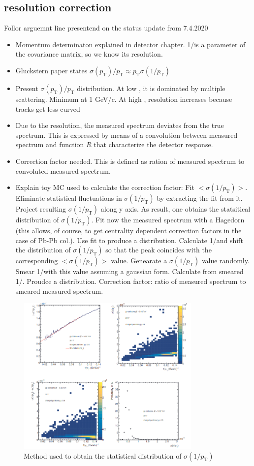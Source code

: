 \documentclass[12pt,a4paper]{report}
\begin{document}
\subsection{\pt resolution correction}
Follor arguemnt line presentend on the status update from 7.4.2020
\begin{itemize}
\item Momentum determinaton explained in detector chapter. 1/\pt is a parameter of the covariance matrix, so we know its resolution. 
\item Gluckstern paper states $\sigma(p_\text{T})/p_\text{T} \approx p_\text{T}\sigma(1/p_\text{T})$
\item Present $\sigma(p_\text{T})/p_\text{T}$ distribution. At low \pt, it is dominated by multiple scattering. Minimum at 1 GeV/$c$. At high \pt, resolution increases because tracks get less curved
\item Due to the \pt resolution, the measured spectrum deviates from the true spectrum. This is expressed by means of a convolution between measured spectrum and function $R$ that characterize the detector response.
\item Correction factor needed. This is defined as ration of measured spectrum to convoluted measured spectrum.
\item Explain toy MC used to calculate the correction factor: Fit $<\sigma(1/p_\text{T})>$. Eliminate statistical fluctuations in $\sigma(1/p_\text{T})$  by extracting the fit from it. Project resulting  $\sigma(1/p_\text{T})$ along y axis. As result, one obtains the statsitical distribution of $\sigma(1/p_\text{T})$. Fit now the measured spectrum with a Hagedorn (this allows, of course, to get centrality dependent correction factors in the case of Pb-Pb col.). Use fit to produce a \pt distribution. Calculate 1/\pt and shift the distribution of  $\sigma(1/p_\text{T})$ so that the peak coincides with the corresponding $<\sigma(1/p_\text{T})>$ value. Genearate a $\sigma(1/p_\text{T})$ value randomly. Smear 1/\pt with this value assuming a gaussian form. Calculate \pt from smeared 1/\pt. Proudce a \pt distribution. Correction factor: ratio of measured spectrum to smeared measured spectrum. 
\end{itemize}
\begin{figure}[tb!]
\centering
\includegraphics[width=9cm]{Plots/ptResolution.png}  
\caption{Method  used to obtain the statistical distribution of $\sigma(1/p_\text{T})$} 
\end{figure}
\end{document}
